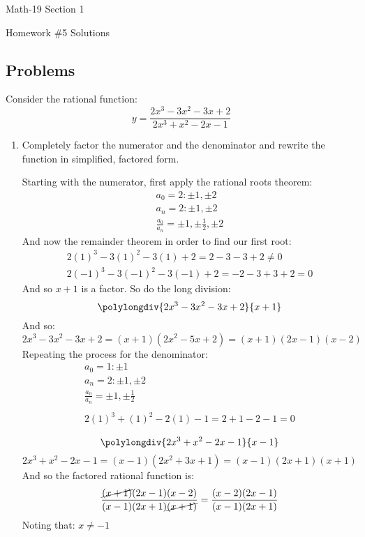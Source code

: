 \documentclass[letterpaper,12pt,fleqn]{article}
\begin{document}
\begin{center}
  \large
  Math-19 Section 1

  \Large
  Homework \#5 Solutions
\end{center}

\subsection*{Problems}

Consider the rational function:
\[y=\frac{2x^3-3x^2-3x+2}{2x^3+x^2-2x-1}\]

\begin{enumerate}
\item Completely factor the numerator and the denominator and rewrite the function in simplified, factored form.

  Starting with the numerator, first apply the rational roots theorem:
  \begin{gather*}
    a_0=2: \pm1,\pm2 \\
    a_n=2: \pm1,\pm2 \\
    \frac{a_0}{a_n}=\pm1,\pm\frac{1}{2},\pm2
  \end{gather*}
  And now the remainder theorem in order to find our first root:
  \begin{gather*}
    2(1)^3-3(1)^2-3(1)+2=2-3-3+2\ne0 \\
    2(-1)^3-3(-1)^2-3(-1)+2=-2-3+3+2=0
  \end{gather*}
  And so \(x+1\) is a factor.  So do the long division:
  \[\polylongdiv{2x^3-3x^2-3x+2}{x+1}\]
  And so:
  \[2x^3-3x^2-3x+2=(x+1)(2x^2-5x+2)=(x+1)(2x-1)(x-2)\]
  Repeating the process for the denominator:
  \begin{gather*}
    a_0=1: \pm1 \\
    a_n=2: \pm1,\pm2 \\
    \frac{a_0}{a_n}=\pm1,\pm\frac{1}{2} \\
    \\
    2(1)^3+(1)^2-2(1)-1=2+1-2-1=0 \\
  \end{gather*}
  \[\polylongdiv{2x^3+x^2-2x-1}{x-1}\]
  \[2x^3+x^2-2x-1=(x-1)(2x^2+3x+1)=(x-1)(2x+1)(x+1)\]
  And so the factored rational function is:
  \[\frac{\cancel{(x+1)}(2x-1)(x-2)}{(x-1)(2x+1)\cancel{(x+1)}}=\frac{(x-2)(2x-1)}{(x-1)(2x+1)}\]
  Noting that: \(x\ne-1\)
  

\end{enumerate}
\end{document}
